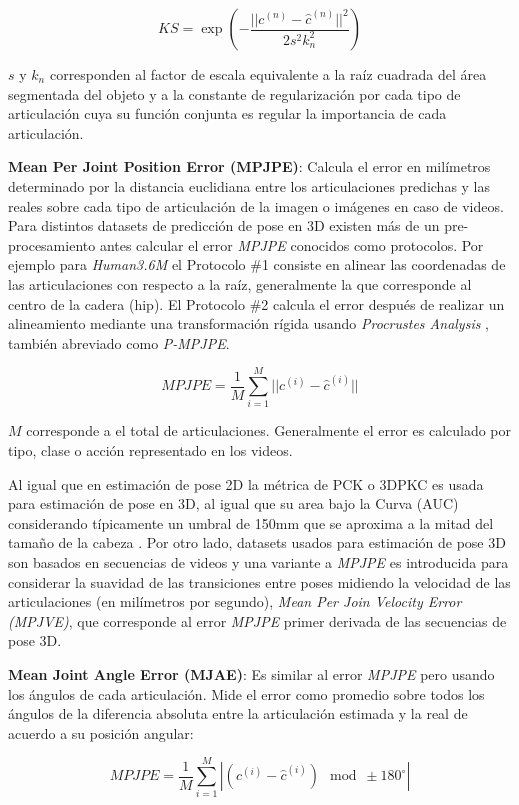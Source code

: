 \begin{equation}
    KS = \exp(- \frac{||c^{(n)} - \hat{c}^{(n)}||^2}{2s^2 k^2_n})
    \label{eq:KS}
\end{equation}

$s$ y $k_n$ corresponden al factor de escala equivalente a la raíz cuadrada del área segmentada del
objeto y a la constante de regularización por cada tipo de articulación cuya su función conjunta
es regular la importancia de cada articulación.


\textbf{Mean Per Joint Position Error (MPJPE)}: Calcula el error en milímetros determinado por la distancia
euclidiana entre los articulaciones predichas y las reales sobre cada tipo de articulación de la
imagen o imágenes en caso de videos. Para distintos datasets de predicción de pose en 3D existen
más de un pre-procesamiento antes calcular el error \textit{MPJPE} conocidos como protocolos.
Por ejemplo para \textit{Human3.6M} el Protocolo \#1 consiste en alinear las coordenadas de las
articulaciones con respecto a la raíz, generalmente la que corresponde al centro de la cadera (hip).
El Protocolo \#2 calcula el error después de realizar un alineamiento mediante una transformación
rígida usando \textit{Procrustes Analysis} \cite{Gower1975}, también abreviado como \textit{P-MPJPE}.

\begin{equation}
    MPJPE = \frac{1}{M} \sum_{i=1}^M ||c^{(i)} - \hat{c}^{(i)}||
    \label{eq:MPJPE}
\end{equation}

$M$ corresponde a el total de articulaciones. Generalmente el error es calculado por tipo, clase o
acción representado en los videos.

Al igual que en estimación de pose 2D la métrica de PCK o 3DPKC es usada para estimación de pose en
3D, al igual que su area bajo la Curva (AUC) considerando típicamente un umbral de 150mm que se
aproxima a la mitad del tamaño de la cabeza \cite{DBLP:journals/corr/MehtaRCSXT16}. Por otro lado,
datasets usados para estimación de pose 3D son basados en secuencias de videos y una variante a
\textit{MPJPE} es introducida \cite{8954163} para considerar la suavidad de las transiciones entre
poses midiendo la velocidad de las articulaciones (en milímetros por segundo),
\textit{Mean Per Join Velocity Error (MPJVE)}, que corresponde al error \textit{MPJPE} primer
derivada de las secuencias de pose 3D.

\textbf{Mean Joint Angle Error (MJAE)}: Es similar al error \textit{MPJPE} pero usando los ángulos de
cada articulación. Mide el error como promedio sobre todos los ángulos de la diferencia absoluta
entre la articulación estimada y la real de acuerdo a su posición angular:

\begin{equation}
    MPJPE = \frac{1}{M} \sum_{i=1}^M |(c^{(i)} - \hat{c}^{(i)}) \mod \pm 180^{\circ}|
    \label{eq:MJAE}
\end{equation}
